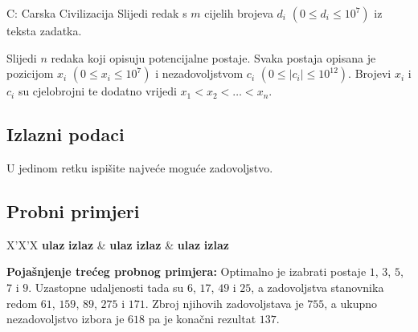 \begin{statement}[
  timelimit=1.5 s,
  memorylimit=512 MiB,
]{C: Carska Civilizacija}
Slijedi redak s $m$ cijelih brojeva $d_i$ $(0 \le d_i \le 10^7)$ iz teksta
zadatka.

Slijedi $n$ redaka koji opisuju potencijalne postaje. Svaka postaja opisana je
  pozicijom $x_i$ $(0 \le x_i \le 10^7)$ i nezadovoljstvom $c_i$ $(0 \le |c_i|
  \le 10^{12})$. Brojevi $x_i$ i $c_i$ su cjelobrojni te dodatno vrijedi $x_1 <
  x_2 < \ldots < x_n$.

\subsection*{Izlazni podaci}
U jedinom retku ispišite najveće moguće zadovoljstvo.

\subsection*{Probni primjeri}
\begin{tabularx}{\textwidth}{X'X'X}
  \textbf{ulaz}
  \linespread{1}{}
  \textbf{izlaz}
  \linespread{1}{} &
  \textbf{ulaz}
  \linespread{1}{}
  \textbf{izlaz}
  \linespread{1}{} &
  \textbf{ulaz}
  \linespread{1}{}
  \textbf{izlaz}
  \linespread{1}{}
\end{tabularx}

\textbf{Pojašnjenje trećeg probnog primjera:}
Optimalno je izabrati postaje $1$, $3$, $5$, $7$ i $9$.  Uzastopne udaljenosti
tada su $6$, $17$, $49$ i $25$, a zadovoljstva stanovnika redom $61$, $159$,
$89$, $275$ i $171$.  Zbroj njihovih zadovoljstava je $755$, a ukupno
nezadovoljstvo izbora je $618$ pa je konačni rezultat $137$.

\end{statement}

